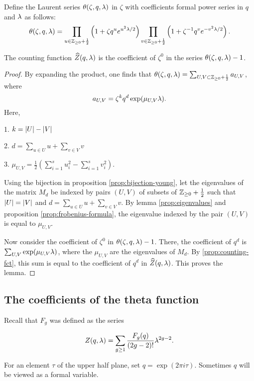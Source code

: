 \begin{defi}
 Define the Laurent series $\theta(\zeta,q,\lambda)$ in $\zeta$ with coefficients formal power series in $q$ and $\lambda$ as follows:
 \[
  \theta(\zeta,q,\lambda) = \prod_{u\in\mathbb{Z}_{\geq 0}+\frac{1}{2}} \left(1+\zeta q^u e^{u^2\lambda/2}\right) \prod_{v\in\mathbb{Z}_{\geq 0}+\frac{1}{2}} \left(1+\zeta^{-1} q^v e^{-v^2\lambda/2}\right).
 \]
\end{defi}

\begin{lemma} \label{prop:theta-expansion}
 The counting function $\widehat{Z}(q,\lambda)$ is the coefficient of $\zeta^0$ in the series $\theta(\zeta,q,\lambda)-1$.
\end{lemma}
\begin{proof}
 By expanding the product, one finds that $\theta(\zeta,q,\lambda)=\sum_{U,V\subset\mathbb{Z}_{\geq 0}+\frac{1}{2}}a_{U,V}$, where \[a_{U,V}=\zeta^k q^d \exp(\mu_{U,V}\lambda).\] Here,
 
 1. $k=|U|-|V|$
 
 2. $d=\sum_{u\in U}u + \sum_{v\in V}v$
 
 3. $\mu_{U,V}=\frac{1}{2}\left(\sum_{i=1}^s u_i^2 - \sum_{i=1}^s v_i^2\right)$.

Using the bijection in proposition \ref{prop:bijection-young}, let the eigenvalues of the matrix $M_d$ be indexed by pairs $(U,V)$ of subsets of $\mathbb{Z}_{\geq 0}+\frac{1}{2}$ such that $|U|=|V|$ and $d=\sum_{u\in U}u + \sum_{v\in V}v$. By lemma \ref{prop:eigenvalues} and proposition \ref{prop:frobenius-formula}, the eigenvalue indexed by the pair $(U,V)$ is equal to $\mu_{U,V}$.

Now consider the coefficient of $\zeta^0$ in $\theta(\zeta,q,\lambda)-1$. There, the coefficient of $q^d$ is $\sum_{U,V}\exp({\mu_{U,V}\lambda})$, where the $\mu_{U,V}$ are the eigenvalues of $M_d$. By \ref{prop:counting-fct}, this sum is equal to the coefficient of $q^d$ in $\widehat{Z}(q,\lambda)$. This proves the lemma.
\end{proof}

\subsection{The coefficients of the theta function}

Recall that $F_g$ was defined as the series

 \[Z(q,\lambda) = \sum_{g\geq 1}\frac{F_g(q)}{(2g-2)!}\lambda^{2g-2}.\]
 
For an element $\tau$ of the upper half plane, set $q=\exp(2\pi i \tau)$. Sometimes $q$ will be viewed as a formal variable.

